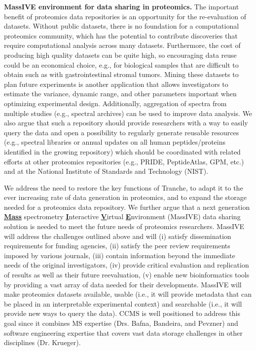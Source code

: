 \documentclass[arial,11pt]{article}
\begin{document}
{\bf MassIVE environment for data sharing in proteomics.} The important benefit of proteomics data repositories is an opportunity for the re-evaluation of datasets. Without public datasets, there is no foundation for a computational proteomics community, which has the potential to contribute discoveries that require computational analysis across many datasets. Furthermore, the cost of producing high quality datasets can be quite high, so encouraging data reuse could be an economical choice, e.g., for biological samples that are difficult to obtain such as with gastrointestinal stromal tumors. Mining these datasets to plan future experiments is another application that allows investigators to estimate the variance, dynamic range, and other parameters important when optimizing experimental design. Additionally, aggregation of spectra from multiple studies (e.g., spectral archives) can be used to improve data analysis. We also argue that such a repository should provide researchers with a way to easily query the data and open a possibility to regularly generate reusable resources (e.g., spectral libraries or annual updates on all human peptides/proteins identified in the growing repository) which should be coordinated with related efforts at other proteomics repositories (e.g., PRIDE, PeptideAtlas, GPM, etc.) and at the National Institute of Standards and Technology (NIST).

We address the need to restore the key functions of Tranche, to adapt it to the ever increasing rate of data generation in proteomics, and to expand the storage needed for a proteomics data repository. We further argue that a next generation \underline{\bf Mass} spectrometry \underline{\bf I}nteractive \underline{\bf V}irtual \underline{\bf E}nvironment (MassIVE) data sharing solution is needed to meet the future needs of proteomics researchers. MassIVE will address the challenges outlined above and will (i) satisfy dissemination requirements for funding agencies, (ii) satisfy the peer review requirements imposed by various journals, (iii) contain information beyond the immediate needs of the original investigators, (iv) provide critical evaluation and replication of results as well as their future reevaluation, (v) enable new bioinformatics tools by providing a vast array of data needed for their  developments. MassIVE will make proteomics datasets available, usable (i.e., it will provide metadata that can be placed in an interpretable experimental context) and searchable (i.e., it will provide new  ways to query the data). CCMS is well positioned to address this goal since it combines MS expertise (Drs. Bafna, Bandeira, and Pevzner) and software engineering expertise that covers vast data storage challenges in other disciplines (Dr. Krueger).
\end{document}
